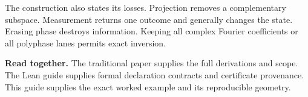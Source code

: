 The construction also states its losses. Projection removes a complementary subspace. Measurement returns one outcome and generally changes the state. Erasing phase destroys information. Keeping all complex Fourier coefficients or all polyphase lanes permits exact inversion.

\textbf{Read together.} The traditional paper supplies the full derivations and scope. The Lean guide supplies formal declaration contracts and certificate provenance. This guide supplies the exact worked example and its reproducible geometry.
